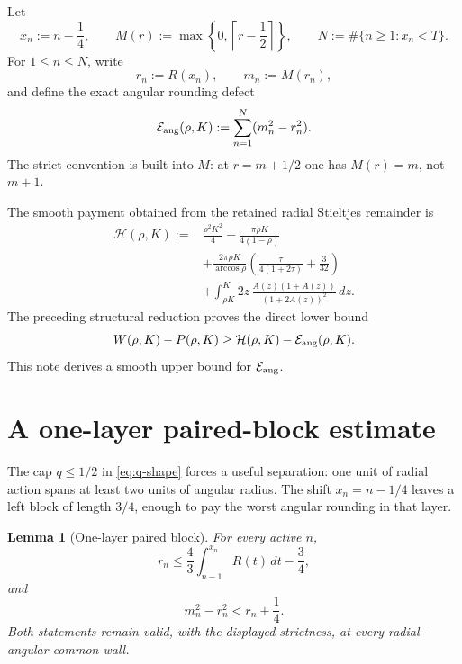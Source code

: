 \documentclass[11pt]{article}
\newtheorem{lemma}{Lemma}
\theoremstyle{remark}
\begin{document}
Let
\begin{equation}
 x_n:=n-\frac14,
 \qquad
 M(r):=\max\left\{0,\left\lceil r-\frac12\right\rceil\right\},
 \qquad
 N:=\#\{n\geq1:x_n<T\}.
 \label{eq:grids}
\end{equation}
For $1\leq n\leq N$, write
\begin{equation}
 r_n:=R(x_n),
 \qquad m_n:=M(r_n),
 \label{eq:rn-mn}
\end{equation}
and define the exact angular rounding defect
\begin{equation}
 \mathcal E_{\rm ang}(\rho,K)
 :=\sum_{n=1}^N(m_n^2-r_n^2).
 \label{eq:Eang}
\end{equation}
The strict convention is built into $M$: at $r=m+1/2$ one has
$M(r)=m$, not $m+1$.

The smooth payment obtained from the retained radial Stieltjes remainder
is
\begin{equation}
 \begin{aligned}
 \mathcal H(\rho,K):={}&
 \frac{\rho^2K^2}{4}
 -\frac{\pi\rho K}{4(1-\rho)}\\
 &+\frac{2\pi\rho K}{\arccos\rho}
   \left(\frac{\tau}{4(1+2\tau)}+\frac3{32}\right)\\
 &+\int_{\rho K}^{K}
 2z\,\frac{A(z)(1+A(z))}{(1+2A(z))^2}\,dz.
 \end{aligned}
 \label{eq:H}
\end{equation}
The preceding structural reduction proves the direct lower bound
\begin{equation}
 W(\rho,K)-P(\rho,K)
 \geq\mathcal H(\rho,K)-\mathcal E_{\rm ang}(\rho,K).
\label{eq:structural-implication}
\end{equation}
This note derives a smooth upper bound for
$\mathcal E_{\rm ang}$.

\section{A one-layer paired-block estimate}

The cap $q\leq1/2$ in \eqref{eq:q-shape} forces a useful separation:
one unit of radial action spans at least two units of angular radius.  The
shift $x_n=n-1/4$ leaves a left block of length $3/4$, enough to pay the
worst angular rounding in that layer.

\begin{lemma}[One-layer paired block]
\label{lem:one-layer}
For every active $n$,
\begin{equation}
 r_n
 \leq\frac43\int_{n-1}^{x_n}R(t)\,dt-\frac34,
 \label{eq:rn-block}
\end{equation}
and
\begin{equation}
 m_n^2-r_n^2<r_n+\frac14.
 \label{eq:rounding-pointwise}
\end{equation}
Both statements remain valid, with the displayed strictness, at every
radial--angular common wall.
\end{lemma}
\end{document}

